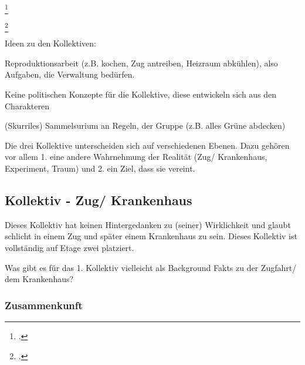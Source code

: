 \documentclass[12pt, a4paper, openany]{report}
\let\tempone\itemize
\let\temptwo\enditemize
\renewenvironment{itemize}{\tempone\addtolength{\itemsep}{-0.5\baselineskip}}{\temptwo}
\begin{document}
\begin{itemize}
    \item[]  \\
    \item[] \footcite[][§ 147, S. 162]{hegel_grundlinien_2017} \\
    \item[] \footcite[][§151, S. 166]{hegel_grundlinien_2017}
\end{itemize}

Ideen zu den Kollektiven:
\begin{itemize}
\item Reproduktionsarbeit (z.B. kochen, Zug antreiben, Heizraum abkühlen), also Aufgaben, die Verwaltung bedürfen.
\item Keine politischen Konzepte für die Kollektive, diese entwickeln sich aus den Charakteren 
\item (Skurriles) Sammelsurium an Regeln, der Gruppe (z.B. alles Grüne abdecken)
\end{itemize}

Die drei Kollektive unterscheiden sich auf verschiedenen Ebenen. 
Dazu gehören vor allem 1. eine andere Wahrnehmung der Realität (Zug/ Krankenhaus, Experiment, Traum) und 2. ein Ziel, dass sie vereint.

\subsection{Kollektiv - Zug/ Krankenhaus}
Dieses Kollektiv hat keinen Hintergedanken zu (seiner) Wirklichkeit und glaubt schlicht in einem Zug und später einem Krankenhaus zu sein. 
Dieses Kollektiv ist vollständig auf Etage zwei platziert. 

Was gibt es für das 1. Kollektiv vielleicht als Background Fakts zu der Zugfahrt/ dem Krankenhaus?

\subsubsection{Zusammenkunft}
\end{document}
